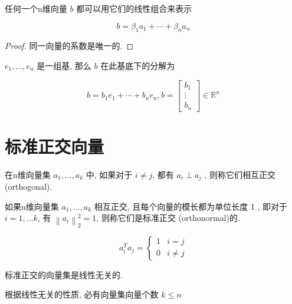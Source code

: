 \begin{definition}
    任何一个n维向量 $ b $ 都可以用它们的线性组合来表示

$$
b=\beta_{1} a_{1}+\cdots+\beta_{n} a_{n}
$$
\end{definition}

\begin{proof}
    同一向量的系数是唯一的. 
\end{proof}

\begin{example}
    $ e_{1}, \ldots, e_{n} $ 是一组基, 那么 $ b $ 在此基底下的分解为

    $$ b=b_{1} e_{1}+\cdots+b_{n} e_{n} ,b=\left[\begin{array}{c}b_{1} \\ \vdots \\ b_{n}\end{array}\right] \in \mathbb{R}^{n} $$
\end{example}

\section{标准正交向量}

\begin{definition}
    在n维向量集 $ a_{1}, \ldots, a_{k} $ 中,  如果对于 $ i \neq j $, 都有 $ a_{i} \perp a_{j} $ ,  则称它们相互正交(orthogonal). 
\end{definition}

\begin{definition}
    如果n维向量集 $ a_{1}, \ldots, a_{k} $ 相互正交, 且每个向量的模长都为单位长度 1 ,  即对于 $ i=1, \ldots k $, 有 $ \left\|a_{i}\right\|_{2}^{2}=1 $, 则称它们是标准正交 (orthonormal)的. 

    $$ a_{i}^{T} a_{j}=\left\{\begin{array}{ll}1 & i=j \\ 0 & i \neq j\end{array}\right. $$
\end{definition}

\begin{corollary}
    标准正交的向量集是线性无关的. 
\end{corollary}

\begin{corollary}
    根据线性无关的性质, 必有向量集向量个数 $ k \leq n $
\end{corollary}

